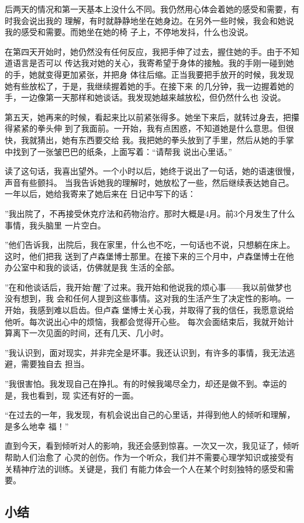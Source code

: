 \documentclass{ctexart}
\begin{document}
后两天的情况和第一天基本上没什么不同。我仍然用心体会着她的感受和需要，有时我会说出我的
理解，有时就静静地坐在她身边。在另外一些时候，我会和她说我的感受和需要。而她坐在她的椅
子上，不停地发抖，什么也没说。

在第四天开始时，她仍然没有任何反应，我把手伸了过去，握住她的手。由于不知道语言是否可以
传达我对她的关心，我寄希望于身体的接触。我的手刚一碰到她的手，她就变得更加紧张，并把身
体往后缩。正当我要把手放开的时候，我发现她有些放松了，于是，我继续握着她的手。在接下来
的几分钟，我一边握着她的手，一边像第一天那样和她谈话。我发现她越来越放松，但仍然什么也
没说。

第五天，她再来的时候，看起来比以前紧张得多。她坐下来后，就转过身去，把攥得紧紧的拳头伸
到了我面前。一开始，我有点困惑，不知道她是什么意思。但很快，我就猜出，她有东西要交给
我。我把她的拳头放到了手里，然后从她的手掌中找到了一张皱巴巴的纸条，上面写着：``请帮我
说出心里话。''

读了这句话，我喜出望外。一个小时以后，她终于说出了一句话，她的语速很慢，声音有些颤抖。
当我告诉她我的理解时，她放松了一些，然后继续表达她自己。一年以后，她给我寄来了她后来在
日记中写下的话：

''我出院了，不再接受休克疗法和药物治疗。那时大概是4月。前3个月发生了什么事情，我头脑里
一片空白。

''他们告诉我，出院后，我在家里，什么也不吃，一句话也不说，只想躺在床上。这时，他们把我
送到了卢森堡博士那里。在接下来的三个月中，卢森堡博士在他办公室中和我的谈话，仿佛就是我
生活的全部。

''在和他谈话后，我开始`醒'了过来。我开始和他说我的烦心事------我以前做梦也没有想到，我
会和任何人提到这些事情。这对我的生活产生了决定性的影响。一开始，我感到难以启齿。但卢森
堡博士关心我，并取得了我的信任，我愿意说给他听。每次说出心中的烦恼，我都会觉得开心些。
每次会面结束后，我就开始计算离下一次见面的时间，还有几天、几小时。

''我认识到，面对现实，并非完全是坏事。我还认识到，有许多的事情，我无法逃避，需要独自去
担当。

''我很害怕。我发现自己在挣扎。有的时候我竭尽全力，却还是做不到。幸运的是，我也看到，现
实还有好的一面。

``在过去的一年，我发现，有机会说出自己的心里话，并得到他人的倾听和理解，是多么地幸
福！''

直到今天，看到倾听对人的影响，我还会感到惊喜。一次又一次，我见证了，倾听帮助人们治愈了
心灵的创伤。作为一个听众，我们并不需要心理学知识或接受有关精神疗法的训练。关键是，我们
有能力体会一个人在某个时刻独特的感受和需要。


\subsection{小结}
\end{document}
